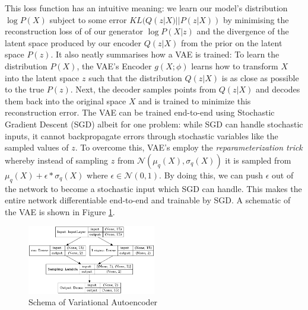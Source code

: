  This loss function has an intuitive meaning: we learn our model's distribution $\log P(X)$ subject to some error $KL(Q(z|X) || P(z|X))$ by minimising the reconstruction loss of of our generator $\log P(X|z)$ and the divergence of the latent space produced by our encoder $Q(z|X)$ from the prior on the latent space $P(z)$. It also neatly summarises how a VAE is trained: To learn the distribution $P(X)$, the VAE's Encoder $g(X; \phi)$ learns how to transform $X$ into the latent space $z$ such that the distribution $Q(z|X)$ is as close as possible to the true $P(z)$. Next, the decoder samples points from $Q(z|X)$ and decodes them back into the original space $X$ and is trained to minimize this reconstruction error. The VAE can be trained end-to-end using Stochastic Gradient Descent (SGD) albeit for one problem: while SGD can handle stochastic inputs, it cannot backpropagate errors through stochastic variables like the sampled values of $z$. To overcome this, VAE's employ the \textit{reparameterization trick} whereby instead of sampling $z$ from $\mathcal{N}(\mu_q(X), \sigma_q(X))$ it is sampled from $\mu_q(X) + \epsilon*\sigma_q(X)$ where $\epsilon \in \mathcal{N}(0,1)$. By doing this, we can push $\epsilon$ out of the network to become a stochastic input which SGD can handle. This makes the entire network differentiable end-to-end and trainable by SGD. A schematic of the VAE is shown in Figure \ref{fig:vae_schema}.
 
 \begin{figure}[htbp]
     \centering
     \includegraphics[width=0.5\textwidth]{images/vae}
     \caption{Schema of Variational Autoencoder}
     \label{fig:vae_schema}
 \end{figure}

